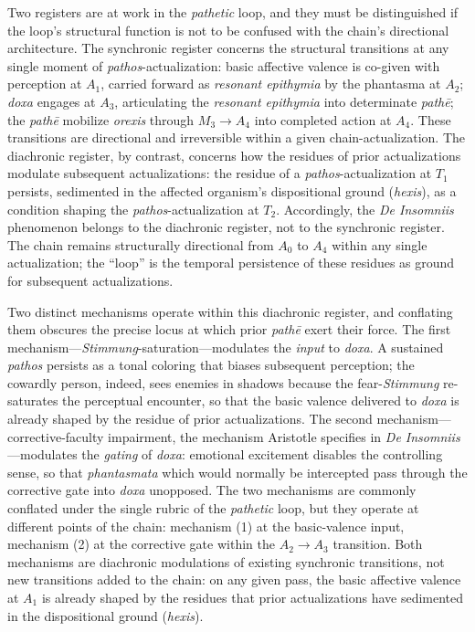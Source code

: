 \documentclass{article}
\begin{document}
Two registers are at work in the \textit{pathetic} loop, and they must be distinguished if the loop's structural function is not to be confused with the chain's directional architecture. The synchronic register concerns the structural transitions at any single moment of \textit{pathos}-actualization: basic affective valence is co-given with perception at $A_1$, carried forward as \textit{resonant epithymia} by the phantasma at $A_2$; \textit{doxa} engages at $A_3$, articulating the \textit{resonant epithymia} into determinate \textit{pathē}; the \textit{pathē} mobilize \textit{orexis} through $M_3 \rightarrow A_4$ into completed action at $A_4$. These transitions are directional and irreversible within a given chain-actualization. The diachronic register, by contrast, concerns how the residues of prior actualizations modulate subsequent actualizations: the residue of a \textit{pathos}-actualization at $T_1$ persists, sedimented in the affected organism's dispositional ground (\textit{hexis}), as a condition shaping the \textit{pathos}-actualization at $T_2$. Accordingly, the \textit{De Insomniis} phenomenon belongs to the diachronic register, not to the synchronic register. The chain remains structurally directional from $A_0$ to $A_4$ within any single actualization; the ``loop'' is the temporal persistence of these residues as ground for subsequent actualizations.

Two distinct mechanisms operate within this diachronic register, and conflating them obscures the precise locus at which prior \textit{pathē} exert their force. The first mechanism---\textit{Stimmung}-saturation---modulates the \textit{input} to \textit{doxa}. A sustained \textit{pathos} persists as a tonal coloring that biases subsequent perception; the cowardly person, indeed, sees enemies in shadows because the fear-\textit{Stimmung} re-saturates the perceptual encounter, so that the basic valence delivered to \textit{doxa} is already shaped by the residue of prior actualizations. The second mechanism---corrective-faculty impairment, the mechanism Aristotle specifies in \textit{De Insomniis}---modulates the \textit{gating} of \textit{doxa}: emotional excitement disables the controlling sense, so that \textit{phantasmata} which would normally be intercepted pass through the corrective gate into \textit{doxa} unopposed. The two mechanisms are commonly conflated under the single rubric of the \textit{pathetic} loop, but they operate at different points of the chain: mechanism (1) at the basic-valence input, mechanism (2) at the corrective gate within the $A_2 \rightarrow A_3$ transition. Both mechanisms are diachronic modulations of existing synchronic transitions, not new transitions added to the chain: on any given pass, the basic affective valence at $A_1$ is already shaped by the residues that prior actualizations have sedimented in the dispositional ground (\textit{hexis}).
\end{document}
